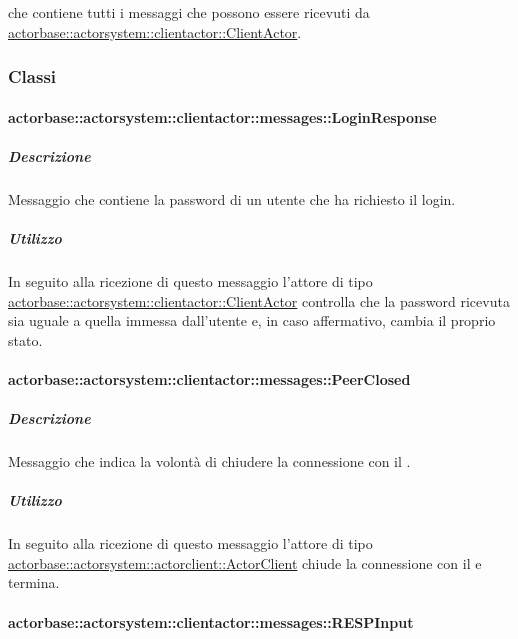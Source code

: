 \documentclass{scalatekids-article}
\begin{document}
 che contiene tutti i messaggi che possono essere ricevuti da
\hyperref[sec:actorbase::actorsystem::clientactor::ClientActor]{actorbase::actorsystem::clientactor::ClientActor}.

\subsubsection{Classi}

\paragraph{actorbase::actorsystem::clientactor::messages::LoginResponse}
\label{sec:actorbase::actorsystem::clientactor::messages::LoginResponse}

\subparagraph{Descrizione}

Messaggio che contiene la password di un utente che ha richiesto il login.

\subparagraph{Utilizzo}

In seguito alla ricezione di questo messaggio l'attore di tipo
\hyperref[sec:actorbase::actorsystem::clientactor::ClientActor]{actorbase::actorsystem::clientactor::ClientActor}
controlla che la password ricevuta sia uguale a quella immessa
dall'utente e, in caso affermativo, cambia il proprio stato.

\paragraph{actorbase::actorsystem::clientactor::messages::PeerClosed}
\label{sec:actorbase::actorsystem::clientactor::messages::PeerClosed}

\subparagraph{Descrizione}

Messaggio che indica la volontà di chiudere la connessione con il .

\subparagraph{Utilizzo}

In seguito alla ricezione di questo messaggio l'attore di tipo
\hyperref[sec:actorbase::actorsystem::actorclient::ActorClient]{actorbase::actorsystem::actorclient::ActorClient}
chiude la connessione con il  e termina.

\paragraph{actorbase::actorsystem::clientactor::messages::RESPInput}
\label{sec:actorbase::actorsystem::clientactor::messages::RESPInput}
\end{document}
